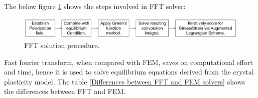 The below figure \ref{FFT Solution procedure} shows the steps involved in FFT solver:
\begin{figure}[H]
    \centering
    \includegraphics[width=\textwidth]{images/FFT solution procedure.pdf}
    \caption{FFT solution procedure.}
    \label{FFT Solution procedure}
\end{figure}

Fast fourier transform, when compared with FEM, saves on computational effort and time, hence it is used to solve equilibrium equations derived from the crystal plasticity model. The table \ref{Differences between FFT and FEM solvers} shows the differences between FFT and FEM.




